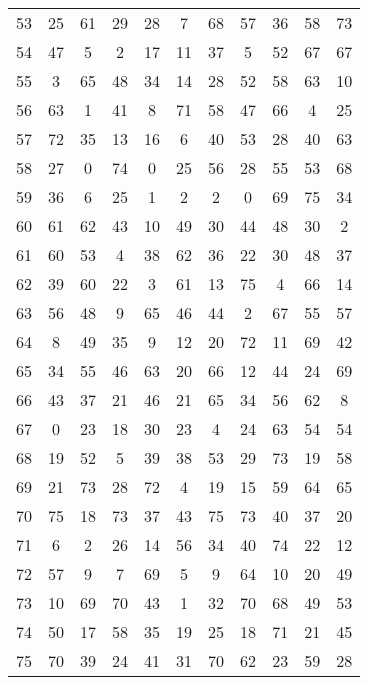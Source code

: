 \begin{table}
\begin{tabular}{c c c c c c c c c c c }
53 & 25 & 61 & 29 & 28 & 7 & 68 & 57 & 36 & 58 & 73 \\
54 & 47 & 5 & 2 & 17 & 11 & 37 & 5 & 52 & 67 & 67 \\
55 & 3 & 65 & 48 & 34 & 14 & 28 & 52 & 58 & 63 & 10 \\
56 & 63 & 1 & 41 & 8 & 71 & 58 & 47 & 66 & 4 & 25 \\
57 & 72 & 35 & 13 & 16 & 6 & 40 & 53 & 28 & 40 & 63 \\
58 & 27 & 0 & 74 & 0 & 25 & 56 & 28 & 55 & 53 & 68 \\
59 & 36 & 6 & 25 & 1 & 2 & 2 & 0 & 69 & 75 & 34 \\
60 & 61 & 62 & 43 & 10 & 49 & 30 & 44 & 48 & 30 & 2 \\
61 & 60 & 53 & 4 & 38 & 62 & 36 & 22 & 30 & 48 & 37 \\
62 & 39 & 60 & 22 & 3 & 61 & 13 & 75 & 4 & 66 & 14 \\
63 & 56 & 48 & 9 & 65 & 46 & 44 & 2 & 67 & 55 & 57 \\
64 & 8 & 49 & 35 & 9 & 12 & 20 & 72 & 11 & 69 & 42 \\
65 & 34 & 55 & 46 & 63 & 20 & 66 & 12 & 44 & 24 & 69 \\
66 & 43 & 37 & 21 & 46 & 21 & 65 & 34 & 56 & 62 & 8 \\
67 & 0 & 23 & 18 & 30 & 23 & 4 & 24 & 63 & 54 & 54 \\
68 & 19 & 52 & 5 & 39 & 38 & 53 & 29 & 73 & 19 & 58 \\
69 & 21 & 73 & 28 & 72 & 4 & 19 & 15 & 59 & 64 & 65 \\
70 & 75 & 18 & 73 & 37 & 43 & 75 & 73 & 40 & 37 & 20 \\
71 & 6 & 2 & 26 & 14 & 56 & 34 & 40 & 74 & 22 & 12 \\
72 & 57 & 9 & 7 & 69 & 5 & 9 & 64 & 10 & 20 & 49 \\
73 & 10 & 69 & 70 & 43 & 1 & 32 & 70 & 68 & 49 & 53 \\
74 & 50 & 17 & 58 & 35 & 19 & 25 & 18 & 71 & 21 & 45 \\
75 & 70 & 39 & 24 & 41 & 31 & 70 & 62 & 23 & 59 & 28 \\
\hline
\end{tabular}
\end{table}